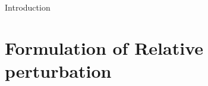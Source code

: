 \documentclass[a4paper,11pt]{article}
\newtheorem{theorem}{Theorem}
\theoremstyle{remark}
\begin{document}
%
%
%
%
%
Introduction
\section{Formulation of Relative perturbation}

\end{document}
